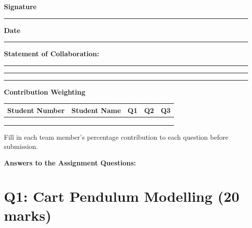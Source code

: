 \documentclass[11pt,a4paper]{article}
\begin{document}
{\begin{minipage}{\dimexpr\textwidth-2\fboxsep-2\fboxrule\relax}
\vspace{12pt}
\textbf{Signature} \rule{5cm}{0.4pt} \hfill \textbf{Date} \rule{3cm}{0.4pt}\par

\vspace{10pt}
\textbf{Statement of Collaboration:}\par
\vspace{2pt}
\rule{\linewidth}{0.4pt}\par
\vspace{8pt}
\rule{\linewidth}{0.4pt}\par
\vspace{8pt}
\rule{\linewidth}{0.4pt}\par
\vspace{6pt}
\end{minipage}}

\vfill

\newpage

\begin{center}
\textbf{Contribution Weighting}\par
\vspace{4pt}
\begin{tabular}{|l|l|c|c|c|}
\hline
\textbf{Student Number} & \textbf{Student Name} & \textbf{Q1} & \textbf{Q2} & \textbf{Q3}\\
\hline
 &  &  &  & \\ \hline
 &  &  &  & \\ \hline
 &  &  &  & \\ \hline
\end{tabular}
\end{center}

\vspace{6pt}
{\small Fill in each team member's percentage contribution to each question
before submission.}

\vspace{10pt}

\begin{center}\large\bfseries Answers to the Assignment Questions:\end{center}

\section*{Q1: Cart Pendulum Modelling \hfill (20 marks)}
\end{document}
